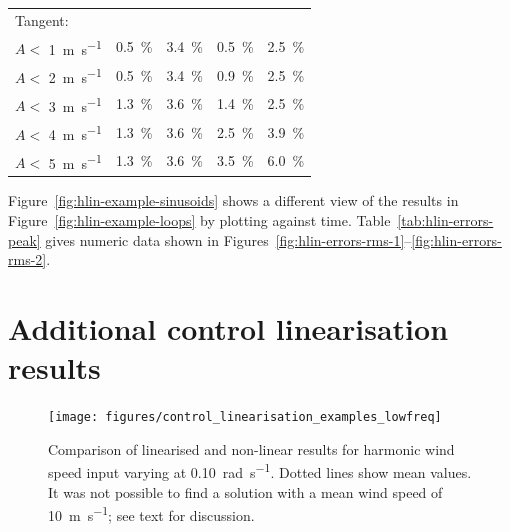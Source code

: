 \documentclass[a4paper,preprint]{elsarticle}
\begin{document}
\begin{table}
\begin{tabular}{lrrrr}
    \multicolumn{4}{l}{Tangent:} \\
    $A<$ \SI{ 1 }{\metre\per\second}& \SI{ 0.5 }{\%}& \SI{ 3.4 }{\%}& \SI{ 0.5 }{\%}& \SI{ 2.5 }{\%}\\
    $A<$ \SI{ 2 }{\metre\per\second}& \SI{ 0.5 }{\%}& \SI{ 3.4 }{\%}& \SI{ 0.9 }{\%}& \SI{ 2.5 }{\%}\\
    $A<$ \SI{ 3 }{\metre\per\second}& \SI{ 1.3 }{\%}& \SI{ 3.6 }{\%}& \SI{ 1.4 }{\%}& \SI{ 2.5 }{\%}\\
    $A<$ \SI{ 4 }{\metre\per\second}& \SI{ 1.3 }{\%}& \SI{ 3.6 }{\%}& \SI{ 2.5 }{\%}& \SI{ 3.9 }{\%}\\
    $A<$ \SI{ 5 }{\metre\per\second}& \SI{ 1.3 }{\%}& \SI{ 3.6 }{\%}& \SI{ 3.5 }{\%}& \SI{ 6.0 }{\%}\\

    \bottomrule
  \end{tabular}
\end{table}

Figure~\ref{fig:hlin-example-sinusoids} shows a different view of the results in
Figure~\ref{fig:hlin-example-loops} by plotting against time.
Table~\ref{tab:hlin-errors-peak} gives numeric data shown in
Figures~\ref{fig:hlin-errors-rms-1}--\ref{fig:hlin-errors-rms-2}.



\section{Additional control linearisation results}
\label{sec:appendix-control-results}

\begin{figure}
  \centering
  \hspace*{-1cm}\texttt{[image: figures/control\_linearisation\_examples\_lowfreq]}
  \caption{Comparison of linearised and non-linear results for harmonic
    wind speed input varying at \SI{0.10}{\radian\per\second}. Dotted
    lines show mean values. It was not possible to find a solution
    with a mean wind speed of \SI{10}{\metre\per\second}; see text for
    discussion.}
\label{fig:control-lin-lowfreq}
\end{figure}
\end{document}
